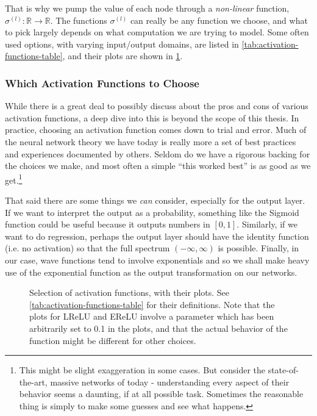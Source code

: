\documentclass[Thesis.tex]{subfiles}
\begin{document}
That is why we pump the value of each
node through a \emph{non-linear} function, $\sigma^{(l)}: \mathbb{R}\to\mathbb{R}$.
The functions $\sigma^{(l)}$ can really be any function we choose, and what to
pick largely depends on what computation we are trying to model. Some often used
options, with varying input/output domains, are listed in
\cref{tab:activation-functions-table}, and their plots are shown in
\cref{fig:activation-function-gallery}.

\subsubsection{Which Activation Functions to Choose}

While there is a great deal to possibly discuss about the pros and cons of various
activation functions, a deep dive into this is beyond the scope of this
thesis. In practice, choosing an activation function comes down to trial
and error. Much of the neural network theory we have today is really more a set
of best practices and experiences documented by others. Seldom do we have a
rigorous backing for the choices we make, and most often a simple ``this worked
best'' is as good as we get.\footnote{This might be slight exaggeration in some
cases. But consider the state-of-the-art, massive networks of today -
understanding every aspect of their behavior seems a daunting, if at all
possible task. Sometimes the reasonable thing is simply to make some guesses and
see what happens.}

That said there are some things we \emph{can} consider, especially for the
output layer. If we want to interpret the output as a probability, something
like the Sigmoid function could be useful because it outputs numbers in $[0,
1]$. Similarly, if we want to do regression, perhaps the output layer should
have the identity function (i.e. no activation) so that the full spectrum
$(-\infty, \infty)$ is possible. Finally, in our case, wave functions tend to
involve exponentials and so we shall make heavy use of the exponential function
as the output transformation on our networks.

\begin{figure}[h]
  \centering
  
  \caption[Gallery of selected activation functions]{Selection of activation functions, with their plots. See
    \cref{tab:activation-functions-table} for their definitions. Note that the
    plots for LReLU and EReLU involve a parameter which has been arbitrarily set
    to 0.1 in the plots, and that the actual behavior of the function might be
    different for other choices.
  }
  \label{fig:activation-function-gallery}
\end{figure}
\end{document}
